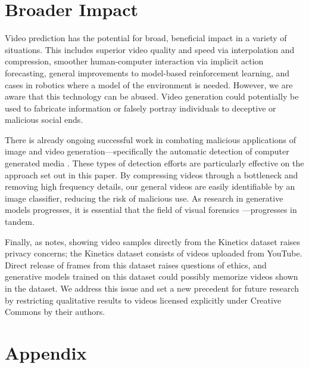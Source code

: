 \documentclass{article}
\begin{document}
\section*{Broader Impact}
Video prediction has the potential for broad, beneficial impact in a variety of situations. This includes superior video quality and speed via interpolation and compression, smoother human-computer interaction via implicit action forecasting, general improvements to model-based reinforcement learning, and cases in robotics where a model of the environment is needed. However, we are aware that this technology can be abused. Video generation could potentially be used to fabricate information or falsely portray individuals to deceptive or malicious social ends. 

There is already ongoing successful work in combating malicious applications of image and video generation---specifically the automatic detection of computer generated media \cite{afchar2018, sabir2019, xinsheng2019}. These types of detection efforts are particularly effective on the approach set out in this paper. By compressing videos through a bottleneck and removing high frequency details, our general videos are easily identifiable by an image classifier, reducing the risk of malicious use. As research in generative models progresses, it is essential that the field of visual forensics \cite{HuhLOE18}---progresses in tandem.

Finally, as \cite{clark2020adversarial} notes, showing video samples directly from the Kinetics dataset raises privacy concerns; the Kinetics dataset consists of videos uploaded from YouTube. Direct release of frames from this dataset raises questions of ethics, and generative models trained on this dataset could possibly memorize videos shown in the dataset. We address this issue and set a new precedent for future research by restricting qualitative results to videos licensed explicitly under Creative Commons by their authors. 

\section{Appendix}
\end{document}
